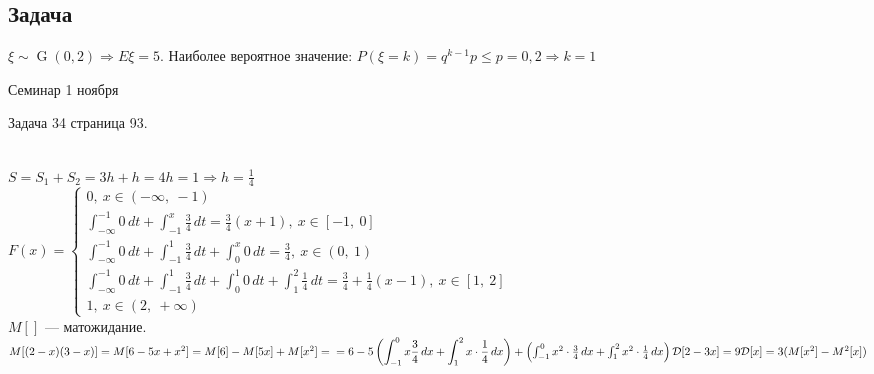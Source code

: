\documentclass[12pt, a4paper]{article}
\begin{document}
    \subsection*{Задача}
    $\xi \sim \operatorname{G}(0,2)\Rightarrow E\xi = 5$. Наиболее вероятное значение: $P(\xi = k) = q^{k - 1}p \leq p = 0,2\Rightarrow k = 1$
    \begin{center}
        Семинар 1 ноября
    \end{center}
    Задача 34 страница 93.\\
    \\
    $S = S_1 + S_2 = 3h + h = 4h = 1\Rightarrow h = \frac{1}{4}$\\
    $F(x) \displaystyle = \begin{cases}
        0,\ x\in (-\infty,\ -1)\\
        \displaystyle \int_{-\infty}^{-1} 0\, dt + \int_{-1}^{x} \frac{3}{4}\, dt = \frac{3}{4}(x + 1),\ x\in [-1,\ 0]\\
        \displaystyle \int_{-\infty}^{-1} 0\, dt + \int_{-1}^{1} \frac{3}{4}\, dt + \int_0^{x} 0\, dt = \frac{3}{4},\ x \in (0,\ 1)\\
        \displaystyle \int_{-\infty}^{-1} 0\, dt + \int_{-1}^{1} \frac{3}{4}\, dt + \int_0^{1} 0\, dt + \int_{1}^{2} \frac{1}{4}\, dt = \frac{3}{4} + \frac{1}{4}(x - 1),\ x\in [1,\ 2]\\
        1,\ x \in (2,\ +\infty)
    \end{cases}$\\
    $M[]$ --- матожидание.\\
    $M[(2 - x)(3 - x)] = M[6 - 5x + x^2] = M[6] - M[5x] + M[x^2] =\\
    = 6 - 5\left(\displaystyle \int_{-1}^{0} x \frac{3}{4}\, dx + \int_{1}^2x\cdot \frac{1}{4}\, dx\right) + \left(\int_{-1}^{0}x^2\cdot \frac{3}{4}\, dx + \int_{1}^{2}x^2 \cdot \frac{1}{4}\, dx\right)\\
    \mathcal{D}[2 - 3x] = 9\mathcal{D}[x] = 3(M[x^2] - M^2[x])$\\
\end{document}
